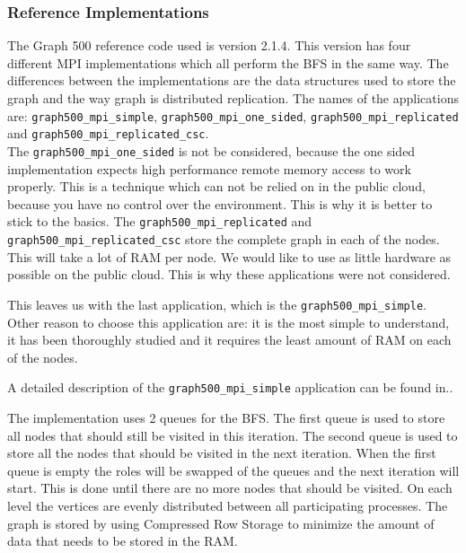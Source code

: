 \subsubsection{Reference Implementations}

The Graph 500 reference code\cite{graph500-code} used is version 2.1.4. This version has four different MPI implementations which all perform the BFS in the same way. The differences between the implementations are the data structures used to store the graph and the way  graph is distributed replication. The names of the applications are: \texttt{graph500\_mpi\_simple}, \texttt{graph500\_mpi\_one\_sided}, \texttt{graph500\_mpi\_replicated} and \texttt{graph500\_mpi\_replicated\_csc}.
\\ 
The \texttt{graph500\_mpi\_one\_sided} is not be considered, because the one sided implementation expects high performance remote memory access to work properly. This is a technique which can not be relied on in the public cloud, because you have no control over the environment. This is why it is better to stick to the basics. The \texttt{graph500\_mpi\_replicated} and \texttt{graph500\_mpi\_replicated\_csc} store the complete graph in each of the nodes. This will take a lot of RAM per node. We would like to use as little hardware as possible on the public cloud. This is why these applications were not considered.

This leaves us with the last application, which is the \texttt{graph500\_mpi\_simple}. Other reason to choose this application are: it is the most simple to understand, it has been thoroughly studied and it requires the least amount of RAM on each of the nodes. 

A detailed description of the \texttt{graph500\_mpi\_simple} application can be found in.\cite{suzumura2011performance}.

The implementation uses 2 queues for the BFS. The first queue is used to store all nodes that should still be visited in this iteration. The second queue is used to store all the nodes that should be visited in the next iteration. When the first queue is empty the roles will be swapped of the queues and the next iteration will start. This is done until there are no more nodes that should be visited. On each level the vertices are evenly distributed between all participating processes. The graph is stored by using Compressed Row Storage\cite{crs} to minimize the amount of data that needs to be stored in the RAM.

